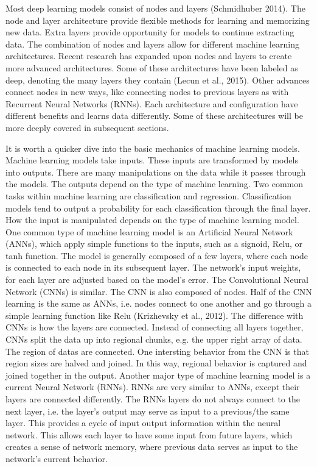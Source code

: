 Most deep learning models consist of nodes and layers (Schmidhuber 2014).  The node and layer architecture provide flexible methods for learning and memorizing new data.  Extra layers provide opportunity for models to continue extracting data.  The combination of nodes and layers allow for different machine learning architectures.  Recent research has expanded upon nodes and layers to create more advanced architectures.  Some of these architectures have been labeled as deep, denoting the many layers they contain (Lecun et al., 2015). Other advances connect nodes in new ways, like connecting nodes to previous layers as with Recurrent Neural Networks (RNNs).  Each architecture and configuration have different benefits and learns data differently.  Some of these architectures will be more deeply covered in subsequent sections.  

It is worth a quicker dive into the basic mechanics of machine learning models. Machine learning models take inputs.  These inputs are transformed by models into outputs.  There are many manipulations on the data while it passes through the models.  The outputs depend on the type of machine learning.  Two common tasks within machine learning are classification and regression.  Classification models tend to output a probability for each classification through the final layer.  How the input is manipulated depends on the type of machine learning model.  One common type of machine learning model is an Artificial Neural Network (ANNs), which apply simple functions to the inputs, such as a signoid, Relu, or tanh function.  The model is generally composed of a few layers, where each node is connected to each node in its subsequent layer.  The network's input weights, for each layer are adjusted based on the model's error.  The Convolutional Neural Network (CNNs) is similar.  The CNN is also composed of nodes.  Half of the CNN learning is the same as ANNs, i.e. nodes connect to one another and go through a simple learning function like Relu (Krizhevsky et al., 2012).  The difference with CNNs is how the layers are connected.  Instead of connecting all layers together, CNNs split the data up into regional chunks, e.g. the upper right array of data.  The region of datas are connected.  One intersting behavior from the CNN is that region sizes are halved and joined.  In this way, regional behavior is captured and joined together in the output.  Another major type of machine learning model is a current Neural Network (RNNs).  RNNs are very similar to ANNs, except their layers are connected differently.  The RNNs layers do not always connect to the next layer, i.e. the layer's output may serve as input to a previous/the same layer.  This provides a cycle of input output information within the neural network.  This allows each layer to have some input from future layers, which creates a sense of network memory, where previous data serves as input to the network's current behavior.  

